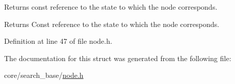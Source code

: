 Returns const reference to the state to which the node corresponds. 

\begin{DoxyReturn}{Returns}
Const reference to the state to which the node corresponds. 
\end{DoxyReturn}


Definition at line 47 of file node.\+h.



The documentation for this struct was generated from the following file\+:\begin{DoxyCompactItemize}
\item 
core/search\+\_\+base/\hyperlink{node_8h}{node.\+h}\end{DoxyCompactItemize}
